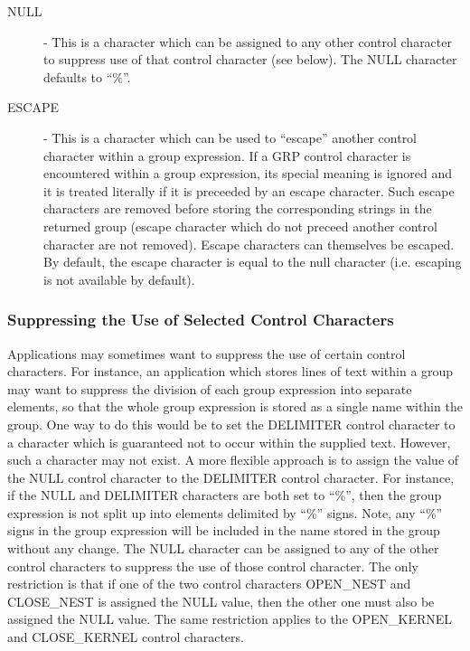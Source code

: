 \begin{description}
\item [NULL] - This is a character which can be assigned to any other control
character to suppress use of that control character (see below). The NULL
character defaults to ``\%''.

\item [ESCAPE] - This is a character which can be used to ``escape'' another
control character within a group expression. If a GRP control character is
encountered within a group expression, its special meaning is ignored
and it is treated literally if it is preceeded by an escape character.
Such escape characters are removed before storing the corresponding
strings in the returned group (escape character which do not preceed
another control character are not removed). Escape characters can
themselves be escaped. By default, the escape character is equal to the
null character (i.e. escaping is not available by default).

\end{description}

\subsubsection {Suppressing the Use of Selected Control Characters}
Applications may sometimes want to suppress the use of certain control
characters. For instance, an application which stores lines of text within a
group may want to suppress the division of each group expression into separate
elements, so that the whole group expression is stored as a single name within
the group. One way to do this would be to set the DELIMITER control character to
a character which is guaranteed not to occur within the supplied text. However,
such a character may not exist. A more flexible approach is to assign the value
of the NULL control character to the DELIMITER control character. For instance,
if the NULL and DELIMITER characters are both set to ``\%'', then the group
expression is not split up into elements delimited by ``\%'' signs. Note, any
``\%'' signs in the group expression will be included in the name stored in the
group without any change. The NULL character can be assigned to any of the other
control characters to suppress the use of those control character. The only
restriction is that if one of the two control characters OPEN\_NEST and
CLOSE\_NEST is assigned the NULL value, then the other one must also be assigned
the NULL value. The same restriction applies to the OPEN\_KERNEL and
CLOSE\_KERNEL control characters.

